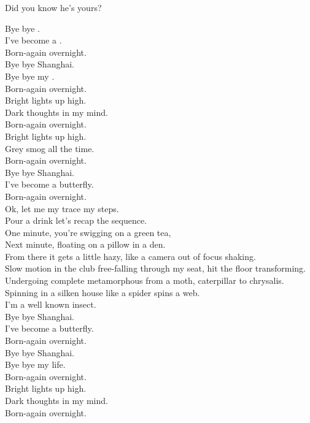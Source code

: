 Did you know he's yours? \\




Bye bye . \\
I've become a . \\
Born-again overnight. \\
Bye bye Shanghai. \\
Bye bye my . \\
Born-again overnight. \\
Bright lights up high. \\
Dark thoughts in my mind. \\
Born-again overnight. \\
Bright lights up high. \\
Grey smog all the time. \\
Born-again overnight. \\
Bye bye Shanghai. \\
I've become a butterfly. \\
Born-again overnight. \\

Ok, let me my trace my steps. \\
Pour a drink let's recap the sequence. \\
One minute, you're swigging on a green tea, \\
Next minute, floating on a pillow in a den. \\
From there it gets a little hazy, like a camera out of focus shaking. \\
Slow motion in the club free-falling through my seat, hit the floor transforming. \\
Undergoing complete metamorphous from a moth, caterpillar to chrysalis. \\
Spinning in a silken house like a spider spins a web. \\
I'm a well known insect. \\

Bye bye Shanghai. \\
I've become a butterfly. \\
Born-again overnight. \\
Bye bye Shanghai. \\
Bye bye my life. \\
Born-again overnight. \\
Bright lights up high. \\
Dark thoughts in my mind. \\
Born-again overnight. \\

